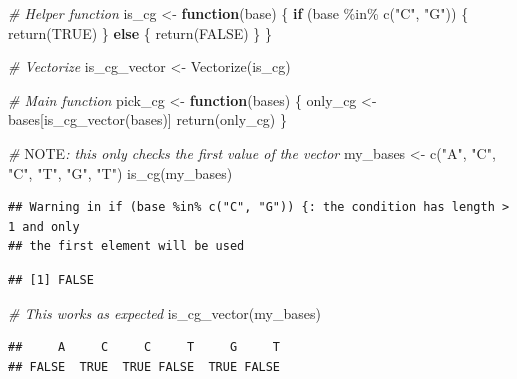 \documentclass[
]{book}
\newenvironment{Shaded}{\begin{snugshade}}{\end{snugshade}}
\newcommand{\AlertTok}[1]{\textcolor[rgb]{0.94,0.16,0.16}{#1}}
\newcommand{\CommentTok}[1]{\textcolor[rgb]{0.56,0.35,0.01}{\textit{#1}}}
\newcommand{\ConstantTok}[1]{\textcolor[rgb]{0.00,0.00,0.00}{#1}}
\newcommand{\ControlFlowTok}[1]{\textcolor[rgb]{0.13,0.29,0.53}{\textbf{#1}}}
\newcommand{\FunctionTok}[1]{\textcolor[rgb]{0.00,0.00,0.00}{#1}}
\newcommand{\NormalTok}[1]{#1}
\newcommand{\OtherTok}[1]{\textcolor[rgb]{0.56,0.35,0.01}{#1}}
\newcommand{\SpecialCharTok}[1]{\textcolor[rgb]{0.00,0.00,0.00}{#1}}
\newcommand{\StringTok}[1]{\textcolor[rgb]{0.31,0.60,0.02}{#1}}
\begin{document}
\begin{Shaded}
\begin{Highlighting}[]
\CommentTok{\# Helper function}
\NormalTok{is\_cg }\OtherTok{\textless{}{-}} \ControlFlowTok{function}\NormalTok{(base) \{}
  \ControlFlowTok{if}\NormalTok{ (base }\SpecialCharTok{\%in\%} \FunctionTok{c}\NormalTok{(}\StringTok{"C"}\NormalTok{, }\StringTok{"G"}\NormalTok{)) \{}
    \FunctionTok{return}\NormalTok{(}\ConstantTok{TRUE}\NormalTok{)}
\NormalTok{  \} }\ControlFlowTok{else}\NormalTok{ \{}
    \FunctionTok{return}\NormalTok{(}\ConstantTok{FALSE}\NormalTok{)}
\NormalTok{  \}}
\NormalTok{\}}

\CommentTok{\# Vectorize}
\NormalTok{is\_cg\_vector }\OtherTok{\textless{}{-}} \FunctionTok{Vectorize}\NormalTok{(is\_cg)}

\CommentTok{\# Main function}
\NormalTok{pick\_cg }\OtherTok{\textless{}{-}} \ControlFlowTok{function}\NormalTok{(bases) \{}
\NormalTok{  only\_cg }\OtherTok{\textless{}{-}}\NormalTok{ bases[}\FunctionTok{is\_cg\_vector}\NormalTok{(bases)]}
  \FunctionTok{return}\NormalTok{(only\_cg)}
\NormalTok{\}}

\CommentTok{\# }\AlertTok{NOTE}\CommentTok{: this only checks the first value of the vector}
\NormalTok{my\_bases }\OtherTok{\textless{}{-}} \FunctionTok{c}\NormalTok{(}\StringTok{"A"}\NormalTok{, }\StringTok{"C"}\NormalTok{, }\StringTok{"C"}\NormalTok{, }\StringTok{"T"}\NormalTok{, }\StringTok{"G"}\NormalTok{, }\StringTok{"T"}\NormalTok{)}
\FunctionTok{is\_cg}\NormalTok{(my\_bases)}
\end{Highlighting}
\end{Shaded}

\begin{verbatim}
## Warning in if (base %in% c("C", "G")) {: the condition has length > 1 and only
## the first element will be used
\end{verbatim}

\begin{verbatim}
## [1] FALSE
\end{verbatim}

\begin{Shaded}
\begin{Highlighting}[]
\CommentTok{\# This works as expected}
\FunctionTok{is\_cg\_vector}\NormalTok{(my\_bases)}
\end{Highlighting}
\end{Shaded}

\begin{verbatim}
##     A     C     C     T     G     T 
## FALSE  TRUE  TRUE FALSE  TRUE FALSE
\end{verbatim}
\end{document}
